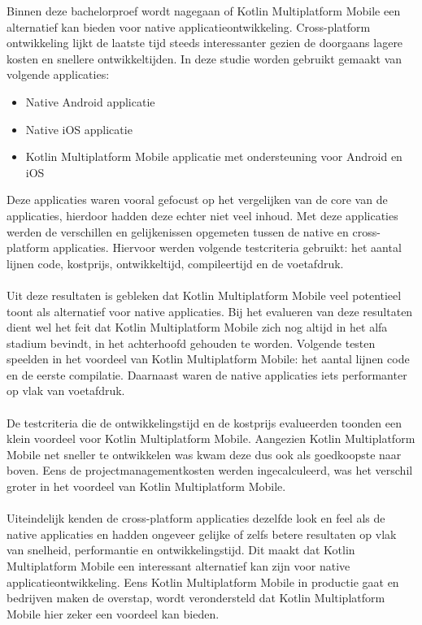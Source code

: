 Binnen deze bachelorproef wordt nagegaan of Kotlin Multiplatform Mobile een alternatief kan bieden voor native applicatieontwikkeling. Cross-platform ontwikkeling lijkt de laatste tijd steeds interessanter gezien de doorgaans lagere kosten en snellere ontwikkeltijden. In deze studie worden  gebruikt gemaakt van volgende applicaties: 
\begin{itemize}
    \item Native Android applicatie
    \item Native iOS applicatie
    \item Kotlin Multiplatform Mobile applicatie met ondersteuning voor Android en iOS
\end{itemize}
Deze applicaties waren vooral gefocust op het vergelijken van de core van de applicaties, hierdoor hadden deze echter niet veel inhoud. Met deze applicaties werden de verschillen en gelijkenissen opgemeten tussen de native en cross-platform applicaties. Hiervoor werden volgende testcriteria gebruikt: het aantal lijnen code, kostprijs, ontwikkeltijd, compileertijd en de voetafdruk.
\\ \\
Uit deze resultaten is gebleken dat Kotlin Multiplatform Mobile veel potentieel toont als alternatief voor native applicaties. Bij het evalueren van deze resultaten dient wel het feit dat Kotlin Multiplatform Mobile zich nog altijd in het alfa stadium bevindt, in het achterhoofd gehouden te worden. Volgende testen speelden in het voordeel van Kotlin Multiplatform Mobile: het aantal lijnen code en de eerste compilatie. Daarnaast waren de native applicaties iets performanter op vlak van voetafdruk.
\\ \\ 
De testcriteria die de ontwikkelingstijd en de kostprijs evalueerden toonden een klein voordeel voor Kotlin Multiplatform Mobile. Aangezien Kotlin Multiplatform Mobile net sneller te ontwikkelen was kwam deze dus ook als goedkoopste naar boven. Eens de projectmanagementkosten werden ingecalculeerd, was het verschil groter in het voordeel van Kotlin Multiplatform Mobile.
\\ \\
Uiteindelijk kenden de cross-platform applicaties dezelfde look en feel als de native applicaties en hadden ongeveer gelijke of zelfs betere resultaten op vlak van snelheid, performantie en ontwikkelingstijd. Dit maakt dat Kotlin Multiplatform Mobile een interessant alternatief kan zijn voor native applicatieontwikkeling. Eens Kotlin Multiplatform Mobile in productie gaat en bedrijven maken de overstap, wordt verondersteld dat Kotlin Multiplatform Mobile hier zeker een voordeel kan bieden.
\\ \\
